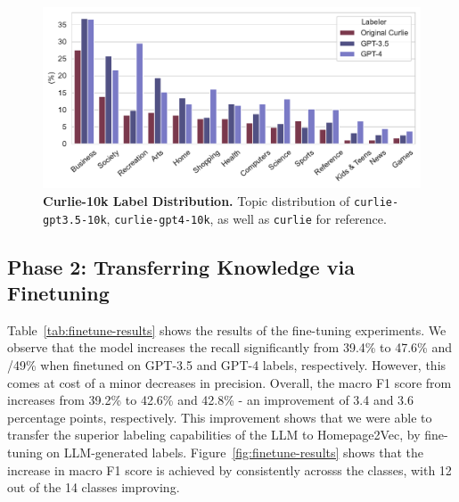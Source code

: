 \begin{figure}[!ht]
    \centering
    \includegraphics[width=.8\columnwidth]{figures/curlie-10k-dist.pdf}
    \caption{\textbf{Curlie-10k Label Distribution.} Topic distribution of \texttt{curlie-gpt3.5-10k}, \texttt{curlie-gpt4-10k}, as well as \texttt{curlie} for reference.}
    \label{fig:curlie-10k-dist}
\end{figure}

\subsection*{Phase 2: Transferring Knowledge via Finetuning}

Table~\ref{tab:finetune-results} shows the results of the fine-tuning experiments. 
We observe that the model increases the recall significantly from 39.4\% to 47.6\% and /49\% when finetuned on GPT-3.5 and GPT-4 labels, respectively.
However, this comes at cost of a minor decreases in precision. Overall, the macro F1 score from increases from 39.2\% to 42.6\% and 42.8\% - an improvement of 3.4 and 3.6 percentage points, respectively.
This improvement shows that we were able to transfer the superior labeling capabilities of the LLM to Homepage2Vec, by fine-tuning on LLM-generated labels. Figure~\ref{fig:finetune-results} shows that the increase in macro F1 score is achieved by consistently acrosss the classes, with 12 out of the 14 classes improving.




